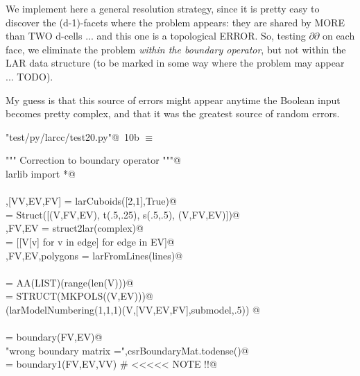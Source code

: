 \documentclass[11pt,oneside]{article}    %
\begin{document}
We implement here a general resolution strategy, since it is pretty  easy to discover the (d-1)-facets where the problem appears:  they are shared by MORE than TWO d-cells ... and this one is a topological ERROR. So, testing $\partial\partial$ on each face, we eliminate the problem \emph{within the boundary operator}, but not within the LAR data structure (to be marked in some way where the problem may appear ... TODO).

My guess is that this source of errors might appear anytime the Boolean input becomes pretty complex, and that it was the greatest source of random errors. 

\begin{flushleft} \small \label{scrap18}
\protect{}\verb@"test/py/larcc/test20.py"@\nobreak\ {\footnotesize 10b }$\equiv$
\vspace{-1ex}
\begin{list}{}{} \item
\mbox{}\verb@""" Correction to boundary operator """@\\
\mbox{}\verb@from larlib import *@\\
\mbox{}\verb@@\\
\mbox{}\verb@V,[VV,EV,FV] = larCuboids([2,1],True)@\\
\mbox{}\verb@complex = Struct([(V,FV,EV), t(.5,.25), s(.5,.5), (V,FV,EV)])@\\
\mbox{}\verb@V,FV,EV = struct2lar(complex)@\\
\mbox{}\verb@lines = [[V[v] for v in edge] for edge in EV]@\\
\mbox{}\verb@V,FV,EV,polygons = larFromLines(lines)@\\
\mbox{}\verb@@\\
\mbox{}\verb@VV = AA(LIST)(range(len(V)))@\\
\mbox{}\verb@submodel = STRUCT(MKPOLS((V,EV)))@\\
\mbox{}\verb@VIEW(larModelNumbering(1,1,1)(V,[VV,EV,FV],submodel,.5)) @\\
\mbox{}\verb@@\\
\mbox{}\verb@csrBoundaryMat = boundary(FV,EV)@\\
\mbox{}\verb@print "wrong boundary matrix =",csrBoundaryMat.todense()@\\
\mbox{}\verb@csrBoundaryMat = boundary1(FV,EV,VV)  # <<<<< NOTE !!@\\

\end{list}
\end{flushleft}
\end{document}
